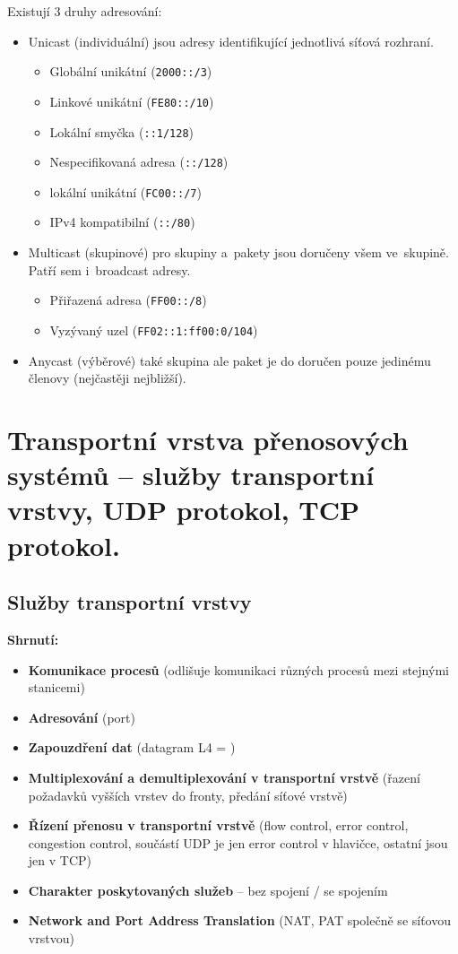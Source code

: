 Existují 3 druhy adresování:
\begin{itemize}[noitemsep]
    \item Unicast (individuální) jsou adresy identifikující jednotlivá síťová rozhraní.
    \begin{itemize}[noitemsep]
        \item Globální unikátní (\texttt{2000::/3})
        \item Linkové unikátní (\texttt{FE80::/10})
        \item Lokální smyčka (\texttt{::1/128})
        \item Nespecifikovaná adresa (\texttt{::/128})
        \item lokální unikátní (\texttt{FC00::/7})
        \item IPv4 kompatibilní (\texttt{::/80})
    \end{itemize}
    \item Multicast (skupinové) pro skupiny a~pakety jsou doručeny všem ve~skupině. Patří sem i~broadcast adresy.
    \begin{itemize}[noitemsep]
        \item Přiřazená adresa (\texttt{FF00::/8})
        \item Vyzývaný uzel (\texttt{FF02::1:ff00:0/104})
    \end{itemize}
    \item Anycast (výběrové) také skupina ale paket je do doručen pouze jedinému členovy (nejčastěji nejbližší).
\end{itemize}

\clearpage
\section{Transportní vrstva přenosových systémů -- služby transportní vrstvy, UDP protokol, TCP protokol.}

\subsection{Služby transportní vrstvy}
\textbf{Shrnutí:}
\begin{itemize}
    \item \textbf{Komunikace procesů} (odlišuje komunikaci různých procesů mezi stejnými stanicemi)
    \item \textbf{Adresování} (port)
    \item \textbf{Zapouzdření dat} (datagram L4 = )
    \item \textbf{Multiplexování a demultiplexování v transportní vrstvě} (řazení požadavků vyšších vrstev do fronty, předání síťové vrstvě)
    \item \textbf{Řízení přenosu v transportní vrstvě} (flow control, error control, congestion control, součástí UDP je jen error control v hlavičce, ostatní jsou jen v TCP)
    \item \textbf{Charakter poskytovaných služeb} -- bez spojení / se spojením
    \item \textbf{Network and Port Address Translation} (NAT, PAT společně se síťovou vrstvou)
\end{itemize}

